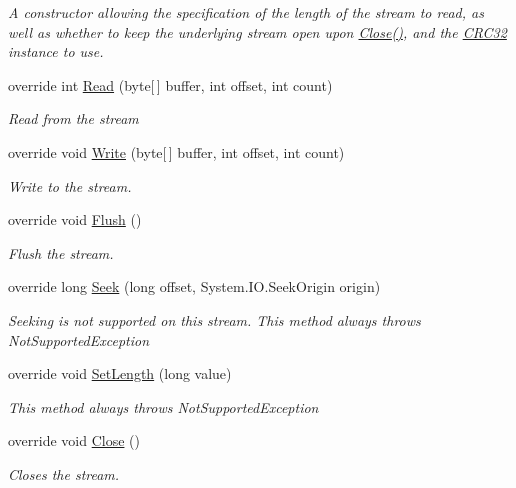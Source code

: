 \begin{DoxyCompactItemize}
\begin{DoxyCompactList}\small\item\em A constructor allowing the specification of the length of the stream to read, as well as whether to keep the underlying stream open upon \mbox{\hyperlink{class_super_tiled2_unity_1_1_ionic_1_1_crc_1_1_crc_calculator_stream_af4509c6b2480109b3b52f3881b5a8f5f}{Close()}}, and the \mbox{\hyperlink{class_super_tiled2_unity_1_1_ionic_1_1_crc_1_1_c_r_c32}{C\+R\+C32}} instance to use. \end{DoxyCompactList}\item 
override int \mbox{\hyperlink{class_super_tiled2_unity_1_1_ionic_1_1_crc_1_1_crc_calculator_stream_a916cf33c4cf7001e2a208a32512be101}{Read}} (byte\mbox{[}$\,$\mbox{]} buffer, int offset, int count)
\begin{DoxyCompactList}\small\item\em Read from the stream \end{DoxyCompactList}\item 
override void \mbox{\hyperlink{class_super_tiled2_unity_1_1_ionic_1_1_crc_1_1_crc_calculator_stream_a74d764a6d8b8697dd938780fe39cb9ee}{Write}} (byte\mbox{[}$\,$\mbox{]} buffer, int offset, int count)
\begin{DoxyCompactList}\small\item\em Write to the stream. \end{DoxyCompactList}\item 
override void \mbox{\hyperlink{class_super_tiled2_unity_1_1_ionic_1_1_crc_1_1_crc_calculator_stream_a0b78c545a1e8a6f87803f6a9882dbd0c}{Flush}} ()
\begin{DoxyCompactList}\small\item\em Flush the stream. \end{DoxyCompactList}\item 
override long \mbox{\hyperlink{class_super_tiled2_unity_1_1_ionic_1_1_crc_1_1_crc_calculator_stream_ac3c75860bb0f9ef265ca55de52ed7734}{Seek}} (long offset, System.\+I\+O.\+Seek\+Origin origin)
\begin{DoxyCompactList}\small\item\em Seeking is not supported on this stream. This method always throws Not\+Supported\+Exception \end{DoxyCompactList}\item 
override void \mbox{\hyperlink{class_super_tiled2_unity_1_1_ionic_1_1_crc_1_1_crc_calculator_stream_a4b3bc7f1c16f514f7ae549c2175a15ae}{Set\+Length}} (long value)
\begin{DoxyCompactList}\small\item\em This method always throws Not\+Supported\+Exception \end{DoxyCompactList}\item 
override void \mbox{\hyperlink{class_super_tiled2_unity_1_1_ionic_1_1_crc_1_1_crc_calculator_stream_af4509c6b2480109b3b52f3881b5a8f5f}{Close}} ()
\begin{DoxyCompactList}\small\item\em Closes the stream. \end{DoxyCompactList}\end{DoxyCompactItemize}
